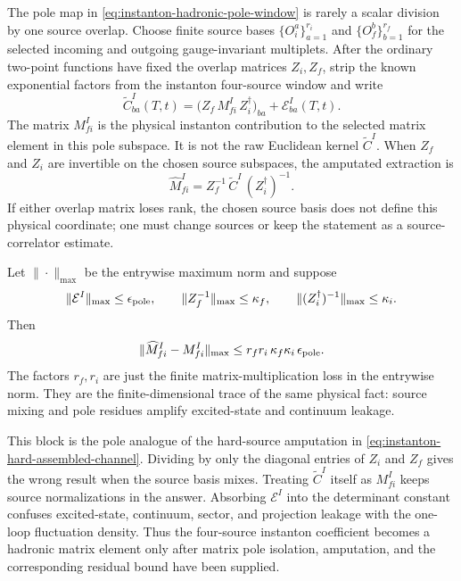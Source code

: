 \begin{controlledapproximation}
\label{ca:instanton-pole-normalized-four-source-extraction}
The pole map in
\eqref{eq:instanton-hadronic-pole-window} is rarely a scalar division by one
source overlap.  Choose finite source bases
\(\{O_i^a\}_{a=1}^{r_i}\) and \(\{O_f^b\}_{b=1}^{r_f}\) for the selected
incoming and outgoing gauge-invariant multiplets.  After the ordinary
two-point functions have fixed the overlap matrices \(Z_i,Z_f\), strip the
known exponential factors from the instanton four-source window and write
\begin{equation}
  \widetilde C_{ba}^{I}(T,t)
  =
  \bigl(Z_f\,M_{fi}^{I}\,Z_i^\dagger\bigr)_{ba}
  +\mathcal E_{ba}^{I}(T,t).
  \label{eq:instanton-pole-matrix-window}
\end{equation}
The matrix \(M_{fi}^{I}\) is the physical instanton contribution to the
selected matrix element in this pole subspace.  It is not the raw Euclidean
kernel \(\widetilde C^{I}\).  When \(Z_f\) and \(Z_i\) are invertible on the
chosen source subspaces, the amputated extraction is
\begin{equation}
  \widehat M_{fi}^{I}
  =
  Z_f^{-1}\,\widetilde C^{I}\,(Z_i^\dagger)^{-1}.
  \label{eq:instanton-pole-amputated-matrix}
\end{equation}
If either overlap matrix loses rank, the chosen source basis does not define
this physical coordinate; one must change sources or keep the statement as a
source-correlator estimate.

Let \(\|\cdot\|_{\max}\) be the entrywise maximum norm and suppose
\[
  \|\mathcal E^{I}\|_{\max}\le\epsilon_{\rm pole},
  \qquad
  \|Z_f^{-1}\|_{\max}\le\kappa_f,
  \qquad
  \|(Z_i^\dagger)^{-1}\|_{\max}\le\kappa_i .
\]
Then
\begin{equation}
  \|
  \widehat M_{fi}^{I}-M_{fi}^{I}
  \|_{\max}
  \le
  r_f r_i\,\kappa_f\kappa_i\,\epsilon_{\rm pole}.
  \label{eq:instanton-pole-amputation-error-bound}
\end{equation}
The factors \(r_f,r_i\) are just the finite matrix-multiplication loss in the
entrywise norm.  They are the finite-dimensional trace of the same physical
fact: source mixing and pole residues amplify excited-state and continuum
leakage.

This block is the pole analogue of the hard-source amputation in
\eqref{eq:instanton-hard-assembled-channel}.  Dividing by only the diagonal
entries of \(Z_i\) and \(Z_f\) gives the wrong result when the source basis
mixes.  Treating \(\widetilde C^{I}\) itself as \(M_{fi}^{I}\) keeps source
normalizations in the answer.  Absorbing \(\mathcal E^{I}\) into the
determinant constant confuses excited-state, continuum, sector, and
projection leakage with the one-loop fluctuation density.  Thus the
four-source instanton coefficient becomes a hadronic matrix element only
after matrix pole isolation, amputation, and the corresponding residual
bound have been supplied.
\end{controlledapproximation}

